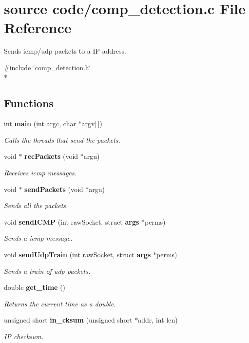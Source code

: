\section{source code/comp\-\_\-detection.c File Reference}
\label{comp__detection_8c}


Sends icmp/udp packets to a I\-P address.  


{\ttfamily \#include \char`\"{}comp\-\_\-detection.\-h\char`\"{}}\\*
\subsection*{Functions}
\begin{DoxyCompactItemize}
\item 
int {\bf main} (int argc, char $\ast$argv[$\,$])
\begin{DoxyCompactList}\small\item\em Calls the threads that send the packets. \end{DoxyCompactList}\item 
void $\ast$ {\bf rec\-Packets} (void $\ast$argu)
\begin{DoxyCompactList}\small\item\em Receives icmp messages. \end{DoxyCompactList}\item 
void $\ast$ {\bf send\-Packets} (void $\ast$argu)
\begin{DoxyCompactList}\small\item\em Sends all the packets. \end{DoxyCompactList}\item 
void {\bf send\-I\-C\-M\-P} (int raw\-Socket, struct {\bf args} $\ast$perms)
\begin{DoxyCompactList}\small\item\em Sends a icmp message. \end{DoxyCompactList}\item 
void {\bf send\-Udp\-Train} (int raw\-Socket, struct {\bf args} $\ast$perms)
\begin{DoxyCompactList}\small\item\em Sends a train of udp packets. \end{DoxyCompactList}\item 
double {\bf get\-\_\-time} ()
\begin{DoxyCompactList}\small\item\em Returns the current time as a double. \end{DoxyCompactList}\item 
unsigned short {\bf in\-\_\-cksum} (unsigned short $\ast$addr, int len)
\begin{DoxyCompactList}\small\item\em I\-P checksum. \end{DoxyCompactList}\end{DoxyCompactItemize}


